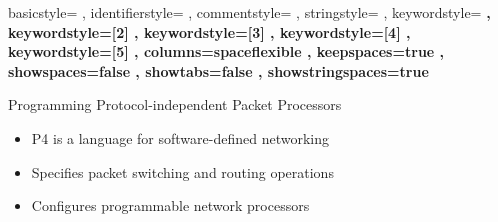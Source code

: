 \documentclass[aspectratio=169]{beamer}
\begin{document}
%
{ basicstyle=\ttfamily%
, identifierstyle=%
, commentstyle=\color[gray]{0.4}%
, stringstyle=\color[rgb]{0, 0, 0.5}%
, keywordstyle=\bfseries%
, keywordstyle=[2]\color[rgb]{0.75, 0, 0}%
, keywordstyle=[3]\color[rgb]{0, 0.5, 0}%
, keywordstyle=[4]\color[rgb]{0, 0.5, 0}%
, keywordstyle=[5]\color[rgb]{0, 0, 0.75}%
, columns=spaceflexible%
, keepspaces=true%
, showspaces=false%
, showtabs=false%
, showstringspaces=true%
}%



\begin{center}
	\maketitle
\end{center}


\begin{frame}{Programming Protocol-independent Packet Processors}
	\begin{itemize}
		\item<1-> P4 is a language for \alert{software-defined networking}
		\item<2-> Specifies packet switching and routing operations
		\item<3-> Configures programmable network processors
	\end{itemize}
\end{frame}
\end{document}
